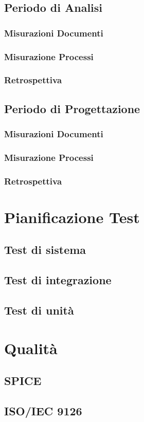 \documentclass[a4paper, oneside, openany, dvipsnames, table]{article}
\begin{document}
	\label{app:misure}
	\subsection{Periodo di Analisi}
		\subsubsection{Misurazioni Documenti}
			
		\subsubsection{Misurazione Processi}
			
		\subsubsection{Retrospettiva}
			
			
	\subsection{Periodo di Progettazione}
		\subsubsection{Misurazioni Documenti}
			
		\subsubsection{Misurazione Processi}
			
		\subsubsection{Retrospettiva}
			
\newpage
\section{Pianificazione Test}
\subsection{Test di sistema}
	
\subsection{Test di integrazione}
	
\subsection{Test di unità}
	
	
\newpage
\section{Qualità}
	\subsection{SPICE}
		\label{app:SPICE}
		
	\subsection{ISO/IEC 9126}
		\label{app:ISO/IEC 9126}
		
\end{document}
